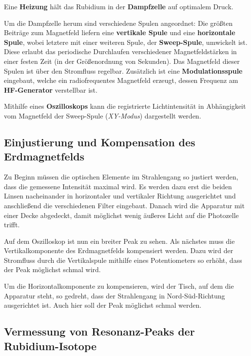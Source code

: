     Eine \textbf{Heizung} hält das Rubidium in der \textbf{Dampfzelle} auf optimalem Druck.

    Um die Dampfzelle herum sind verschiedene Spulen angeordnet:
    Die größten Beiträge zum Magnetfeld liefern eine \textbf{vertikale Spule} und eine \textbf{horizontale Spule},
    wobei letztere mit einer weiteren Spule, der \textbf{Sweep-Spule}, umwickelt ist.
    Diese erlaubt das periodische Durchlaufen verschiedener Magnetfeldstärken in einer festen Zeit
    (in der Größenordnung von Sekunden).
    Das Magnetfeld dieser Spulen ist über den Stromfluss regelbar.
    Zusätzlich ist eine \textbf{Modulationsspule} eingebaut,
    welche ein radiofrequentes Magnetfeld erzeugt,
    dessen Frequenz am \textbf{HF-Generator} verstellbar ist.

    Mithilfe eines \textbf{Oszilloskops} kann die registrierte Lichtintensität
    in Abhängigkeit vom Magnetfeld der Sweep-Spule (\textit{XY-Modus})
    dargestellt werden.

\subsection{Einjustierung und Kompensation des Erdmagnetfelds}
\label{sec:durchfuehrung:einjustierung}

    Zu Beginn müssen die optischen Elemente im Strahlengang so justiert werden,
    dass die gemessene Intensität maximal wird.
    Es werden dazu erst die beiden Linsen nacheinander in horizontaler und vertikaler Richtung ausgerichtet
    und anschließend die verschiedenen Filter eingebaut.
    Danach wird die Apparatur mit einer Decke abgedeckt,
    damit möglichst wenig äußeres Licht auf die Photozelle trifft.

    Auf dem Oszilloskop ist nun ein breiter Peak zu sehen.
    Als nächstes muss die Vertikalkomponente des Erdmagnetfelds kompensiert werden.
    Dazu wird der Stromfluss durch die Vertikalspule mithilfe eines Potentiometers so erhöht,
    dass der Peak möglichst schmal wird.

    Um die Horizontalkomponente zu kompensieren,
    wird der Tisch, auf dem die Apparatur steht, so gedreht,
    dass der Strahlengang in Nord-Süd-Richtung ausgerichtet ist.
    Auch hier soll der Peak möglichst schmal werden.

\subsection{Vermessung von Resonanz-Peaks der Rubidium-Isotope}
\label{sec:durchfuehrung:messung}

